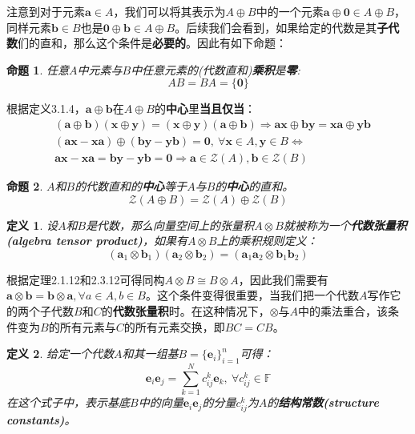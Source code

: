 \documentclass[mathserif,hyperref,UTF8,openany,b5paper]{ctexbook}
\newtheorem{defn}{定义}[section]
\newtheorem{pro}{命题}[section]
\begin{document}
注意到对于元素$\mathbf{a}\in A$，我们可以将其表示为$A\oplus B$中的一个元素$\mathbf{a}\oplus\mathbf{0}\in A\oplus B$，同样元素$\mathbf{b}\in B$也是$\mathbf{0}\oplus\mathbf{b}\in A\oplus B$。后续我们会看到，如果给定的代数是其\textbf{子代数}们的直和，那么这个条件是\textbf{必要的}。因此有如下命题：
\begin{pro}
任意$A$中元素与$B$中任意元素的(代数直和)\textbf{乘积}是\textbf{零}:
\begin{equation}
    \boxed{AB=BA=\{\mathbf{0}\}}
\end{equation}
\end{pro}
根据定义3.1.4，$\mathbf{a}\oplus\mathbf{b}$在$A\oplus B$的\textbf{中心}里\textbf{当且仅当}：
\begin{align}
    &(\mathbf{a}\oplus\mathbf{b})(\mathbf{x}\oplus\mathbf{y})=(\mathbf{x}\oplus\mathbf{y})(\mathbf{a}\oplus\mathbf{b})\Rightarrow\mathbf{ax}\oplus\mathbf{by}=\mathbf{xa}\oplus\mathbf{yb}\\
    &\mathbf{(ax-xa)}\oplus\mathbf{(by-yb)=0},\ \forall \mathbf{x}\in A,\mathbf{y}\in B \Leftrightarrow\\
    &\mathbf{ax-xa=by-yb=0} \Rightarrow \mathbf{a}\in\mathcal{Z}(A),\mathbf{b}\in\mathcal{Z}(B)
\end{align}
\begin{pro}
$A$和$B$的代数直和的\textbf{中心}等于$A$与$B$的\textbf{中心}的直和。
\begin{equation}
    \boxed{\mathcal{Z}(A\oplus B)=\mathcal{Z}(A)\oplus\mathcal{Z}(B)}
\end{equation}
\end{pro}
\begin{defn}
设$A$和$B$是代数，那么向量空间上的张量积$A\otimes B$就被称为一个\textbf{代数张量积(algebra tensor product)}，如果有$A\otimes B$上的乘积规则定义：
\begin{equation}
    (\mathbf{a}_1\otimes\mathbf{b}_1)(\mathbf{a}_2\otimes\mathbf{b}_2)=(\mathbf{a}_1\mathbf{a}_2\otimes\mathbf{b}_1\mathbf{b}_2)
\end{equation}
\end{defn}
根据定理2.1.12和2.3.12可得同构$A\otimes B\cong B\otimes A$，因此我们需要有$\mathbf{a\otimes b = b\otimes a},\forall a\in A, b\in B$。这个条件变得很重要，当我们把一个代数$A$写作它的两个子代数$B$和$C$的\textbf{代数张量积}时。在这种情况下，$\otimes$与$A$中的乘法重合，该条件变为$B$的所有元素与$C$的所有元素交换，即$BC = CB$。
\begin{defn}
给定一个代数$A$和其一组基$B=\{\mathbf{e}_i\}^n_{i=1}$可得：
\begin{equation}
\boxed{\mathbf{e}_i\mathbf{e}_j=\sum^N_{k=1}c^k_{ij}\mathbf{e}_k, \ \forall c_{ij}^k\in\mathbb{F}}
\end{equation}
在这个式子中，表示基底$B$中的向量$\mathbf{e}_i\mathbf{e}_j$的分量$ c_{ij}^k$为$A$的\textbf{结构常数(structure constants)}。
\end{defn}
\end{document}
